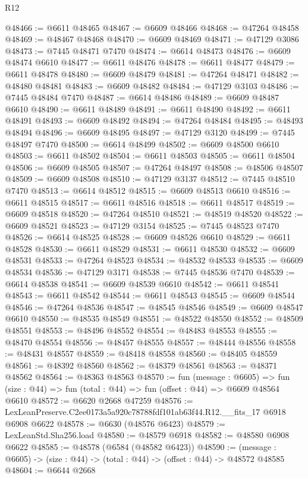 \begin{lexlean}{R12}
\begin{coremodule}
@48466 := @6611 @48465
@48467 := @6609 @48466
@48468 := @47264 @48458
@48469 := @48467 @48468
@48470 := @6609 @48469
@48471 := @47129 @3086
@48473 := @7445 @48471 @7470
@48474 := @6614 @48473
@48476 := @6609 @48474 @6610
@48477 := @6611 @48476
@48478 := @6611 @48477
@48479 := @6611 @48478
@48480 := @6609 @48479
@48481 := @47264 @48471
@48482 := @48480 @48481
@48483 := @6609 @48482
@48484 := @47129 @3103
@48486 := @7445 @48484 @7470
@48487 := @6614 @48486
@48489 := @6609 @48487 @6610
@48490 := @6611 @48489
@48491 := @6611 @48490
@48492 := @6611 @48491
@48493 := @6609 @48492
@48494 := @47264 @48484
@48495 := @48493 @48494
@48496 := @6609 @48495
@48497 := @47129 @3120
@48499 := @7445 @48497 @7470
@48500 := @6614 @48499
@48502 := @6609 @48500 @6610
@48503 := @6611 @48502
@48504 := @6611 @48503
@48505 := @6611 @48504
@48506 := @6609 @48505
@48507 := @47264 @48497
@48508 := @48506 @48507
@48509 := @6609 @48508
@48510 := @47129 @3137
@48512 := @7445 @48510 @7470
@48513 := @6614 @48512
@48515 := @6609 @48513 @6610
@48516 := @6611 @48515
@48517 := @6611 @48516
@48518 := @6611 @48517
@48519 := @6609 @48518
@48520 := @47264 @48510
@48521 := @48519 @48520
@48522 := @6609 @48521
@48523 := @47129 @3154
@48525 := @7445 @48523 @7470
@48526 := @6614 @48525
@48528 := @6609 @48526 @6610
@48529 := @6611 @48528
@48530 := @6611 @48529
@48531 := @6611 @48530
@48532 := @6609 @48531
@48533 := @47264 @48523
@48534 := @48532 @48533
@48535 := @6609 @48534
@48536 := @47129 @3171
@48538 := @7445 @48536 @7470
@48539 := @6614 @48538
@48541 := @6609 @48539 @6610
@48542 := @6611 @48541
@48543 := @6611 @48542
@48544 := @6611 @48543
@48545 := @6609 @48544
@48546 := @47264 @48536
@48547 := @48545 @48546
@48549 := @6609 @48547 @6610
@48550 := @48535 @48549
@48551 := @48522 @48550
@48552 := @48509 @48551
@48553 := @48496 @48552
@48554 := @48483 @48553
@48555 := @48470 @48554
@48556 := @48457 @48555
@48557 := @48444 @48556
@48558 := @48431 @48557
@48559 := @48418 @48558
@48560 := @48405 @48559
@48561 := @48392 @48560
@48562 := @48379 @48561
@48563 := @48371 @48562
@48564 := @48363 @48563
@48570 := fun (message : @6605) =>
  fun (size : @44) => fun (total : @44) => fun (offset : @44) => @6609 @48564 @6610
@48572 := @6620 @2668 @47259
@48576 := LexLeanPreserve.C2ee0173a5a920c78788fdf101ab63f44.R12.__fits_17 @6918 @6908 @6622
@48578 := @6630 (@48576 @6423)
@48579 := LexLeanStd.Sha256.load
@48580 := @48579 @6918
@48582 := @48580 @6908 @6622
@48585 := @48578 (@6584 (@48582 @6423))
@48590 := (message : @6605) -> (size : @44) -> (total : @44) -> (offset : @44) -> @48572 @48585
@48604 := @6644
    @2668

\end{coremodule}
\end{lexlean}
